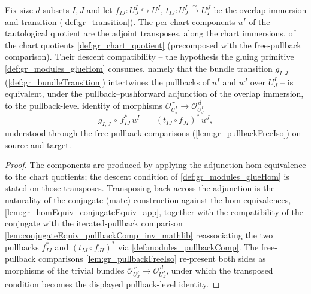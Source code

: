 \begin{lemma}


  \label{lem:gr_tautologicalQuotientComponent_transpose}
  Fix size-\(d\) subsets \(I, J\) and let \(f_{IJ} : U^I_J \hookrightarrow U^I\),
  \(t_{IJ} : U^I_J \xrightarrow{\sim} U^J_I\) be the overlap immersion and transition
  (\cref{def:gr_transition}). The per-chart components \(u^I\) of the tautological quotient
  are the adjoint transposes, along the chart immersions, of the chart quotients
  \cref{def:gr_chart_quotient} (precomposed with the free-pullback comparison). Their
  descent compatibility -- the hypothesis the gluing primitive \cref{def:gr_modules_glueHom}
  consumes, namely that the bundle transition \(g_{I,J}\) (\cref{def:gr_bundleTransition})
  intertwines the pullbacks of \(u^I\) and \(u^J\) over \(U^I_J\) -- is equivalent, under the
  pullback--pushforward adjunction of the overlap immersion, to the pullback-level identity
  of morphisms \(\mathcal{O}_{U^I_J}^{\,r} \to \mathcal{O}_{U^I_J}^{\,d}\)
  \[
    g_{I,J} \,\circ\, f_{IJ}^{*}\,u^I
      \;=\; (t_{IJ} \circ f_{JI})^{*}\,u^J,
  \]
  understood through the free-pullback comparisons (\cref{lem:gr_pullbackFreeIso}) on
  source and target.
\end{lemma}
\begin{proof}
    \leanok
  The components are produced by applying the adjunction hom-equivalence to the chart
  quotients; the descent condition of \cref{def:gr_modules_glueHom} is stated on those
  transposes. Transposing back across the adjunction is the naturality of the conjugate
  (mate) construction against the hom-equivalences, \cref{lem:gr_homEquiv_conjugateEquiv_app},
  together with the compatibility of the conjugate with the iterated-pullback comparison
  \cref{lem:conjugateEquiv_pullbackComp_inv_mathlib} reassociating the two pullbacks
  \(f_{IJ}^{*}\) and \((t_{IJ}\circ f_{JI})^{*}\) via \cref{def:modules_pullbackComp}. The
  free-pullback comparisons \cref{lem:gr_pullbackFreeIso} re-present both sides as morphisms
  of the trivial bundles \(\mathcal{O}_{U^I_J}^{\,r} \to \mathcal{O}_{U^I_J}^{\,d}\), under
  which the transposed condition becomes the displayed pullback-level identity.
\end{proof}

